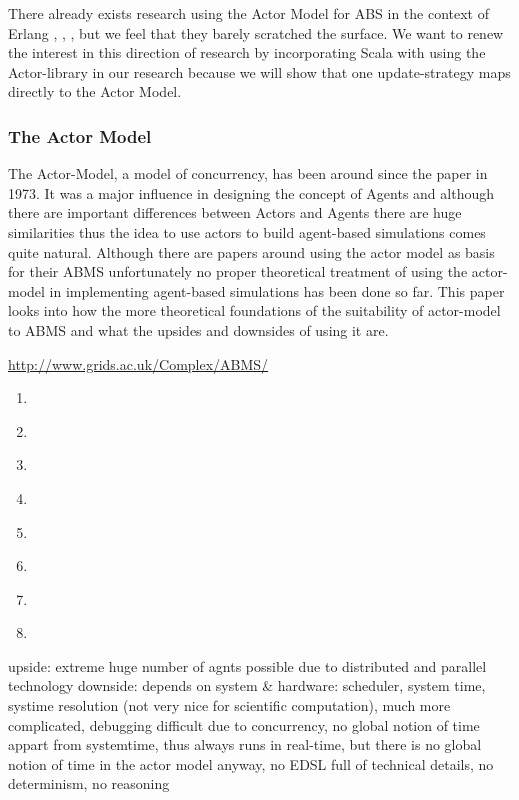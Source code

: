 There already exists research using the Actor Model \cite{agha_actors:_1986} for ABS in the context of Erlang \cite{varela_modelling_2004}, \cite{di_stefano_using_2005}, \cite{di_stefano_exat:_2007}, \cite{sher_agent-based_2013} but we feel that they barely scratched the surface. We want to renew the interest in this direction of research by incorporating Scala with using the Actor-library in our research because we will show that one update-strategy maps directly to the Actor Model.

\subsubsection{The Actor Model}
The Actor-Model, a model of concurrency, has been around since the paper \cite{hewitt_universal_1973} in 1973. It was a major influence in designing the concept of Agents and although there are important differences between Actors and Agents there are huge similarities thus the idea to use actors to build agent-based simulations comes quite natural. Although there are papers around using the actor model as basis for their ABMS unfortunately no proper theoretical treatment of using the actor-model in implementing agent-based simulations has been done so far. This paper looks into how the more theoretical foundations of the suitability of actor-model to ABMS and what the upsides and downsides of using it are.

\url{http://www.grids.ac.uk/Complex/ABMS/}



\begin{enumerate}
\item \cite{Hewitt_1973}
\item \cite{Greif_1975}
\item \cite{Clinger_1981}
\item \cite{Agha_1986}
\item \cite{Agha_1997}
\item \cite{Hewitt_2007}
\item \cite{Hewitt_2010}
\item \cite{Agha_2004}
\end{enumerate}

upside: extreme huge number of agnts possible due to distributed and parallel technology 
downside: depends on system \& hardware: scheduler, system time, systime resolution (not very nice for scientific computation), much more complicated, debugging difficult due to concurrency, no global notion of time appart from systemtime, thus always runs in real-time, but there is no global notion of time in the actor model anyway, no EDSL full of technical details, no determinism, no reasoning


